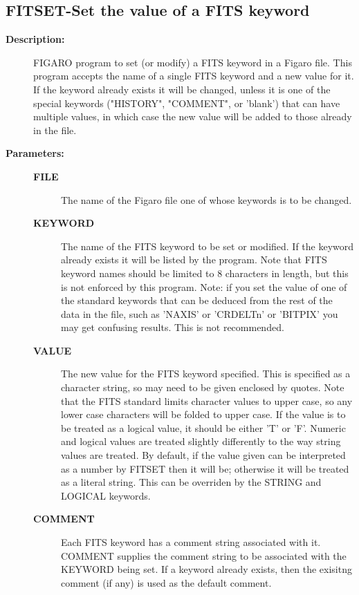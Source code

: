 \subsection{FITSET-\label{FITSET}Set the value of a FITS keyword}
\begin{description}

\item [{\bf Description:}]
 FIGARO program to set (or modify) a FITS keyword in a Figaro file.
 This program accepts the name of a single FITS keyword and a new
 value for it. If the keyword already exists it will be changed,
 unless it is one of the special keywords ("HISTORY", "COMMENT",
 or 'blank') that can have multiple values, in which case the new
 value will be added to those already in the file.

\item [{\bf Parameters:}]
\begin{description}
\item [{\bf FILE}]
 The name of the Figaro file one of whose keywords
 is to be changed.
\item [{\bf KEYWORD}]
 The name of the FITS keyword to be set or modified.
 If the keyword already exists it will be listed by
 the program.  Note that FITS keyword names should
 be limited to 8 characters in length, but this is not
 enforced by this program. Note: if you set the value
 of one of the standard keywords that can be deduced
 from the rest of the data in the file, such as 'NAXIS'
 or 'CRDELTn' or 'BITPIX' you may get confusing results.
 This is not recommended.
\item [{\bf VALUE}]
 The new value for the FITS keyword specified.  This is
 specified as a character string, so may need to be given
 enclosed by quotes. Note that the FITS standard limits
 character values to upper case, so any lower case characters
 will be folded to upper case. If the value is to be treated
 as a logical value, it should be either 'T' or 'F'. Numeric
 and logical values are treated slightly differently to the
 way string values are treated. By default, if the value given
 can be interpreted as a number by FITSET then it will be;
 otherwise it will be treated as a literal string. This can
 be overriden by the STRING and LOGICAL keywords.
\item [{\bf COMMENT}]
 Each FITS keyword has a comment string associated with it.
 COMMENT supplies the comment string to be associated with
 the KEYWORD being set. If a keyword already exists, then
 the exisitng comment (if any) is used as the default comment.

\end{description}
\end{description}
